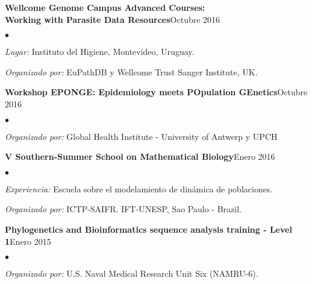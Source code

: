 \documentclass[margin,line]{res}
\newenvironment{list2}{
	\begin{list}{$\bullet$}{%
			\setlength{\itemsep}{0in}
			\setlength{\parsep}{0in} \setlength{\parskip}{0in}
			\setlength{\topsep}{0in} \setlength{\partopsep}{0in}
			\setlength{\leftmargin}{0.2in}}}{\end{list}}
\begin{document}
\begin{resume}
		{\bf Wellcome Genome Campus Advanced Courses:\\Working with Parasite Data Resources}\hfill {Octubre 2016}\\
		\vspace*{-.1in}%
		\begin{list2} %
			\item \textit{Lugar:} Instituto del Higiene, Montevideo, Uruguay.%
			\item \textit{Organizado por:} EuPathDB y Wellcome Trust Sanger Institute, UK. %
		\end{list2}
		
		{\bf Workshop EPONGE: Epidemiology meets POpulation GEnetics}\hfill {Octubre 2016}\\
		\vspace*{-.1in}
		\begin{list2} %
			\item \textit{Organizado por:} Global Health Institute - University of Antwerp y UPCH %
		\end{list2}
		
		{\bf V Southern-Summer School on Mathematical Biology}\hfill {Enero 2016}\\
		\vspace*{-.1in}%
		\begin{list2} %
			\item \textit{Experiencia:} Escuela sobre el modelamiento de dinámica de poblaciones.
			\item \textit{Organizado por:} ICTP-SAIFR. IFT-UNESP, Sao Paulo - Brazil.
		\end{list2}
		
		{\bf Phylogenetics and Bioinformatics sequence analysis training - Level 1}\hfill {Enero 2015}\\
		\vspace*{-.1in}
		\begin{list2} %
			\item \textit{Organizado por:} U.S. Naval Medical Research Unit Six (NAMRU-6).%
		\end{list2}
		

\end{resume}
\end{document}
